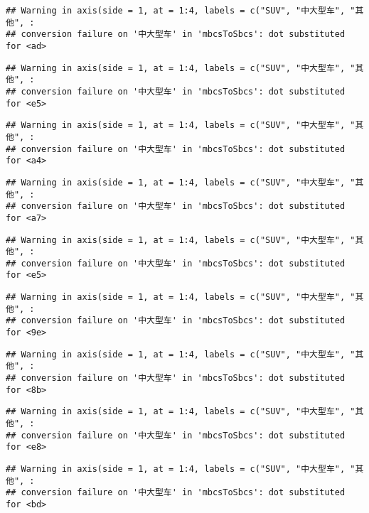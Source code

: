 \documentclass[]{article}
\begin{document}
\begin{verbatim}
## Warning in axis(side = 1, at = 1:4, labels = c("SUV", "中大型车", "其他", :
## conversion failure on '中大型车' in 'mbcsToSbcs': dot substituted for <ad>
\end{verbatim}

\begin{verbatim}
## Warning in axis(side = 1, at = 1:4, labels = c("SUV", "中大型车", "其他", :
## conversion failure on '中大型车' in 'mbcsToSbcs': dot substituted for <e5>
\end{verbatim}

\begin{verbatim}
## Warning in axis(side = 1, at = 1:4, labels = c("SUV", "中大型车", "其他", :
## conversion failure on '中大型车' in 'mbcsToSbcs': dot substituted for <a4>
\end{verbatim}

\begin{verbatim}
## Warning in axis(side = 1, at = 1:4, labels = c("SUV", "中大型车", "其他", :
## conversion failure on '中大型车' in 'mbcsToSbcs': dot substituted for <a7>
\end{verbatim}

\begin{verbatim}
## Warning in axis(side = 1, at = 1:4, labels = c("SUV", "中大型车", "其他", :
## conversion failure on '中大型车' in 'mbcsToSbcs': dot substituted for <e5>
\end{verbatim}

\begin{verbatim}
## Warning in axis(side = 1, at = 1:4, labels = c("SUV", "中大型车", "其他", :
## conversion failure on '中大型车' in 'mbcsToSbcs': dot substituted for <9e>
\end{verbatim}

\begin{verbatim}
## Warning in axis(side = 1, at = 1:4, labels = c("SUV", "中大型车", "其他", :
## conversion failure on '中大型车' in 'mbcsToSbcs': dot substituted for <8b>
\end{verbatim}

\begin{verbatim}
## Warning in axis(side = 1, at = 1:4, labels = c("SUV", "中大型车", "其他", :
## conversion failure on '中大型车' in 'mbcsToSbcs': dot substituted for <e8>
\end{verbatim}

\begin{verbatim}
## Warning in axis(side = 1, at = 1:4, labels = c("SUV", "中大型车", "其他", :
## conversion failure on '中大型车' in 'mbcsToSbcs': dot substituted for <bd>
\end{verbatim}
\end{document}
